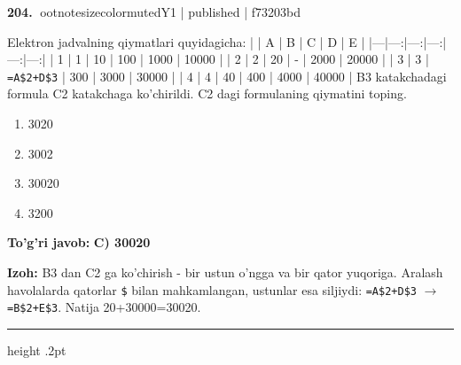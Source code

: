 \documentclass[10pt,a4paper]{article}
\begin{document}
\textbf{\color{ink}204.} {ootnotesizecolor{muted}Y1 | published | f73203bd}
\par
Elektron jadvalning qiymatlari quyidagicha: \newline  \newline |   | A | B | C | D | E | \newline |---|---:|---:|---:|---:|---:| \newline | 1 | 1 | 10 | 100 | 1000 | 10000 | \newline | 2 | 2 | 20 | - | 2000 | 20000 | \newline | 3 | 3 | \texttt{=A\$2+D\$3} | 300 | 3000 | 30000 | \newline | 4 | 4 | 40 | 400 | 4000 | 40000 | \newline  \newline B3 katakchadagi formula C2 katakchaga ko'chirildi. C2 dagi formulaning qiymatini toping.
\begin{enumerate}[label=\Alph*),leftmargin=9mm]
\item 3020
\item 3002
\item 30020
\item 3200
\end{enumerate}
\begin{tcolorbox}[enhanced,breakable,colback=teal!4,colframe=teal!55!black,boxrule=0.45pt,arc=1.2mm,left=2.8mm,right=2.8mm,top=2mm,bottom=2mm]
\textbf{\color{teal}To'g'ri javob:} \textbf{C) 30020}
\par\smallskip
\textbf{Izoh:} B3 dan C2 ga ko'chirish - bir ustun o'ngga va bir qator yuqoriga. Aralash havolalarda qatorlar \texttt{\$} bilan mahkamlangan, ustunlar esa siljiydi: \texttt{=A\$2+D\$3} \ensuremath{\rightarrow} \texttt{=B\$2+E\$3}. Natija 20+30000=30020.
\end{tcolorbox}
\vspace{2mm}\hrule height .2pt\vspace{2mm}
\end{document}
